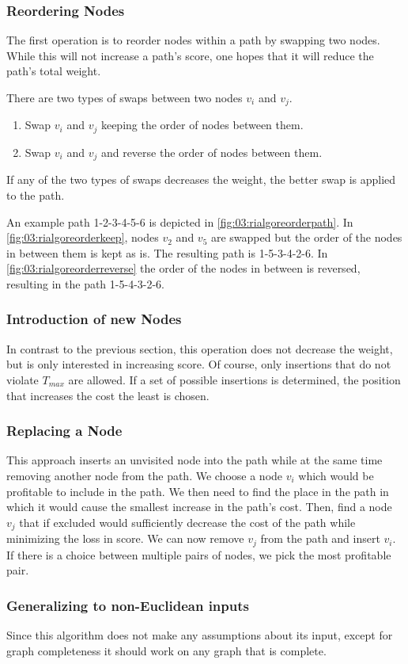 \subsubsection{Reordering Nodes}
\label{subsubsec:03:reorder}

The first operation is to reorder nodes within a path by swapping two nodes.
While this will not increase a path's score, one hopes that it will reduce the path's total weight.

There are two types of swaps between two nodes $v_i$ and $v_j$.
\begin{enumerate}
	\itemsep0em
	\item Swap $v_i$ and $v_j$ keeping the order of nodes between them.
	\item Swap $v_i$ and $v_j$ and reverse the order of nodes between them.
\end{enumerate}
If any of the two types of swaps decreases the weight, the better swap is applied to the path.

An example path 1-2-3-4-5-6 is depicted in \cref{fig:03:rialgoreorderpath}.
In \cref{fig:03:rialgoreorderkeep}, nodes $v_2$ and $v_5$ are swapped but the order of the nodes in between them is kept as is.
The resulting path is 1-5-3-4-2-6.
In \cref{fig:03:rialgoreorderreverse} the order of the nodes in between is reversed, resulting in the path 1-5-4-3-2-6.

\subsubsection{Introduction of new Nodes}

In contrast to the previous section, this operation does not decrease the weight, but is only interested in increasing score.
Of course, only insertions that do not violate $T_{max}$ are allowed.
If a set of possible insertions is determined, the position that increases the cost the least is chosen.

\subsubsection{Replacing a Node}

This approach inserts an unvisited node into the path while at the same time removing another node from the path.
We choose a node $v_i$ which would be profitable to include in the path.
We then need to find the place in the path in which it would cause the smallest increase in the path's cost.
Then, find a node $v_j$ that if excluded would sufficiently decrease the cost of the path while minimizing the loss in score.
We can now remove $v_j$ from the path and insert $v_i$.
If there is a choice between multiple pairs of nodes, we pick the most profitable pair.

\subsubsection{Generalizing to non-Euclidean inputs}

Since this algorithm does not make any assumptions about its input, except for graph completeness it should work on any graph that is complete.

